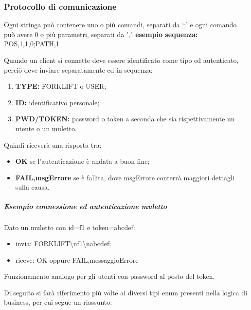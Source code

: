 \subsubsection{Protocollo di comunicazione}
\label{comm-protocol}

Ogni stringa può contenere uno o più comandi, separati da ‘;' e ogni comando può avere 0 o più parametri, separati da ',’.
\textbf{esempio sequenza:} POS,1,1,0;PATH,1

    Quando un client si connette deve essere identificato come tipo ed autenticato, perciò deve inviare separatamente ed in sequenza:
    \begin{enumerate}
        \item \textbf{TYPE: }FORKLIFT o USER;
        \item \textbf{ID: } identificativo personale;
        \item \textbf{PWD/TOKEN: } password o token a seconda che sia rispettivamente un utente o un muletto.
    \end{enumerate}
    Quindi riceverà una risposta tra:
    \begin{itemize}
        \item \textbf{OK } se l'autenticazione è andata a buon fine;
        \item \textbf{FAIL,msgErrore} se è fallita, dove msgErrore conterrà maggiori dettagli sulla causa.
    \end{itemize}
    \subparagraph{Esempio connessione ed autenticazione muletto}
        Dato un muletto con id=f1 e token=abcdef:
        \begin{itemize}
            \item invia: FORKLIFT\textbackslash nf1\textbackslash nabcdef;

            \item riceve: OK oppure FAIL,messaggioErrore
        \end{itemize}


        Funzionamento analogo per gli utenti con password al posto del token.

    Di seguito si farà riferimento più volte ai diversi tipi enum presenti nella logica di business, per cui segue un riassunto:


